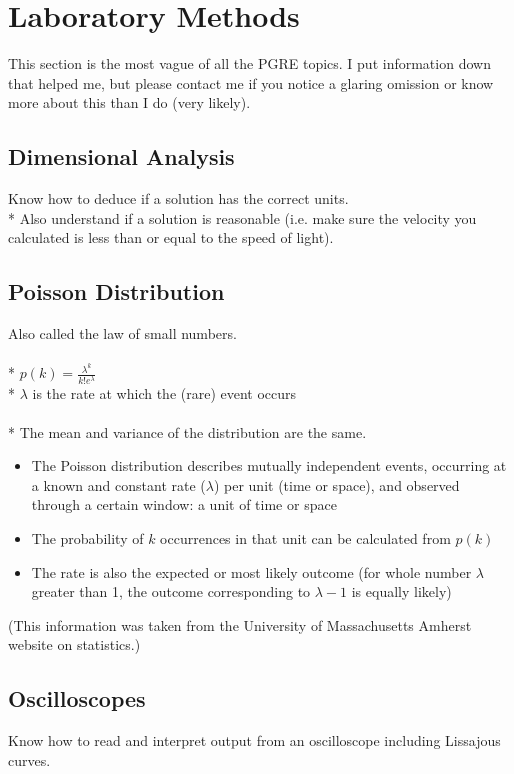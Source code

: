 \section{Laboratory Methods}
This section is the most vague of all the PGRE topics.
I put information down that helped me, but please contact me if you notice a glaring omission or know more about this than I do (very likely).

\subsection{Dimensional Analysis}
Know how to deduce if a solution has the correct units.\\*
Also understand if a solution is reasonable (i.e. make sure the velocity you calculated is less than or equal to the speed of light).

\subsection{Poisson Distribution}
Also called the law of small numbers.\\\\*
\(\displaystyle p(k)=\frac{\lambda^k}{k!e^{\lambda}}\)\\*
\(\lambda\) is the rate at which the (rare) event occurs\\\\*
The mean and variance of the distribution are the same.
\begin{itemize}
\item The Poisson distribution describes mutually independent events, occurring at a known and constant rate (\(\lambda\)) per unit (time or space), and observed through a certain window: a unit of time or space
\item The probability of \(k\) occurrences in that unit can be calculated from \(p(k)\)
\item The rate is also the expected or most likely outcome (for whole number \(\lambda\) greater than 1, the outcome corresponding to \(\lambda-1\) is equally likely)
\end{itemize}
(This information was taken from the University of Massachusetts Amherst website on statistics.)

\subsection{Oscilloscopes}
Know how to read and interpret output from an oscilloscope including Lissajous curves.
